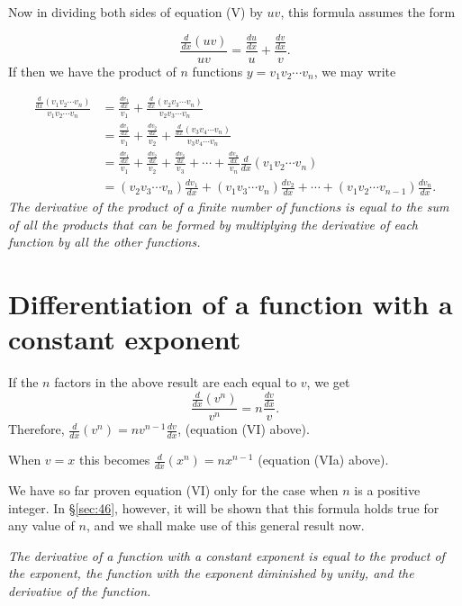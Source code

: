 Now in dividing both sides of equation (V) by $uv$, 
this formula assumes the form

\[
\frac{\frac{d}{dx}(uv)}{uv} 	= \frac{\frac{du}{dx}}{u} + \frac{\frac{dv}{dx}}{v}.
\]
If then we have the product of $n$ functions
$y 	= v_1 v_2 \cdots v_n$,
we may write

\[
\begin{array}{ll}
\frac{\frac{d}{dx}(v_1 v_2 \cdots v_n)}{v_1 v_2 \cdots v_n} 	
&= \frac{\frac{dv_1}{dx}}{v_1} + \frac{\frac{d}{dx} (v_2 v_3 \cdots v_n)}{v_2 v_3 \cdots v_n}\\
&  	= \frac{\frac{dv_1}{dx}}{v_1} + \frac{\frac{dv_2}{dx}}{v_2} + \frac{\frac{d}{dx} (v_3 v_4 \cdots v_n)}{v_3 v_4 \cdots v_n}\\
& 	= \frac{\frac{dv_1}{dx}}{v_1} + \frac{\frac{dv_2}{dx}}{v_2} + \frac{\frac{dv_3}{dx}}{v_3} + \cdots + \frac{\frac{dv_n}{dx}}{v_n}
\frac{d}{dx} (v_1 v_2 \cdots v_n) \\
&	= (v_2 v_3 \cdots v_n)\frac{dv_1}{dx} + (v_1 v_3 \cdots v_n)\frac{dv_2}{dx} + \cdots
  	+ (v_1 v_2 \cdots v_{n - 1})\frac{dv_n}{dx}.
\end{array}
\]
{\it The derivative of the product of a finite number 
of functions is equal to the sum of all the products that 
can be formed by multiplying the derivative of each function 
by all the other functions.}

\section{Differentiation of a function with a constant exponent}
\label{sec:40}

If the $n$ factors in the above result are each equal to $v$, we get
\[
 	\frac{\frac{d}{dx}(v^n)}{v^n} 	= n\frac{\frac{dv}{dx}}{v}.
\]
Therefore, $ \frac{d}{dx}(v^n) 	= nv^{n-1}\frac{dv}{dx}$,
(equation (VI) above). %

When $v = x$ this becomes
$\frac{d}{dx}(x^n) 	= nx^{n - 1}$
(equation (VIa) above). %

We have so far proven equation (VI) only for the case when 
$n$ is a positive integer. In \S \ref{sec:46}, however, 
it will be shown that this formula holds true for any 
value of $n$, and we shall make use of this general result now.

{\it The derivative of a function with a constant exponent is 
equal to the product of the exponent, the function 
with the exponent diminished by unity, and the derivative of the function.}

